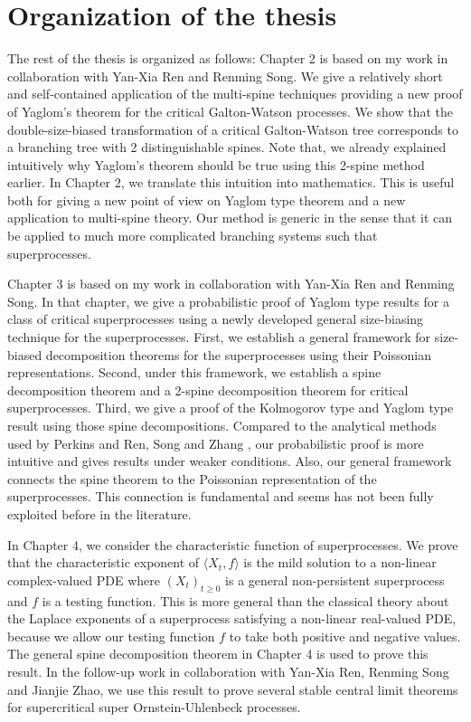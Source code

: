 \documentclass[UTF8]{pkuthss}
\theoremstyle{plain}
\theoremstyle{definition}
\numberwithin{equation}{section}
\begin{document}
\section{Organization of the thesis}
	The rest of the thesis is organized as follows:
	Chapter 2 is based on my work \cite{RenSongSun2018A-2-spine} in collaboration with Yan-Xia Ren and Renming Song.
    We give a relatively short and self-contained application of the multi-spine techniques providing a new proof of Yaglom's theorem for the critical Galton-Watson processes. 
    We show that the double-size-biased transformation of a critical Galton-Watson tree corresponds to a branching tree with 2 distinguishable spines. 
    Note that, we already explained intuitively why Yaglom's theorem should be true using this 2-spine method earlier. 
    In Chapter 2, we translate this intuition into mathematics. 
    This is useful both for giving a new point of view on Yaglom type theorem and a new application to multi-spine theory. 
    Our method is generic in the sense that it can be applied to much more complicated branching systems such that superprocesses. 

    Chapter 3 is based on my work \cite{RenSongSun2017Spine} in collaboration with Yan-Xia Ren and Renming Song. In that chapter, we give a probabilistic proof of Yaglom type results for a class of critical superprocesses using a newly developed general size-biasing technique for the superprocesses. First, we establish a general framework for size-biased decomposition theorems for the superprocesses using their Poissonian representations. Second, under this framework, we establish a spine decomposition theorem and a 2-spine decomposition theorem for critical superprocesses. Third, we give a proof of the Kolmogorov type and Yaglom type result using those spine decompositions.  Compared to the analytical methods used by Perkins \cite{EvansPerkins1990Measure-valued} and Ren, Song and Zhang \cite{RenSongZhang2015Limit}, our probabilistic proof is more intuitive and gives results under weaker conditions. Also, our general framework connects the spine theorem to the Poissonian representation of the superprocesses. This connection is fundamental and seems has not been fully exploited before in the literature. 

    In Chapter 4, we consider the characteristic function of superprocesses. 
    We prove that the characteristic exponent of $\langle X_t,f\rangle$ is the mild solution to a non-linear complex-valued PDE where $(X_t)_{t\geq 0}$ is a general non-persistent superprocess and $f$ is a testing function. 
    This is more general than the classical theory about the Laplace exponents of a superprocess satisfying a non-linear real-valued PDE, because we allow our testing function $f$ to take both positive and negative values. 
    The general spine decomposition theorem in Chapter 4 is used to prove this result. In the follow-up work \cite{RenSongSunZhao2019Stable} in collaboration with Yan-Xia Ren, Renming Song and Jianjie Zhao, we use this result to prove several stable central limit theorems for supercritical super Ornstein-Uhlenbeck processes.
    
\end{document}
